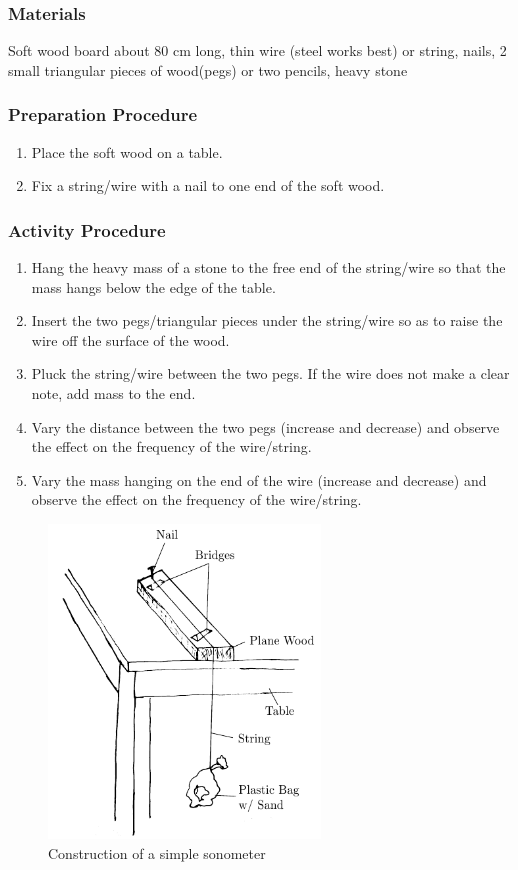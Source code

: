 \subsubsection*{Materials}
Soft wood board about 80 cm long, thin wire (steel works best) or string, nails, 2 small triangular pieces of wood(pegs) or two pencils, heavy stone

\subsubsection*{Preparation Procedure}
\begin{enumerate}
\item{Place the soft wood on a table.} 
\item{Fix a string/wire with a nail to one end of the soft wood.} 
\end{enumerate}

\subsubsection*{Activity Procedure}
\begin{enumerate}
\item{Hang the heavy mass of a stone to the free end of the string/wire so that the mass hangs below the edge of the table.} 
\item{Insert the two pegs/triangular pieces under the string/wire so as to raise the wire off the surface of the wood.} 
\item{Pluck the string/wire between the two pegs. If the wire does not make a clear note, add mass to the end.} 
\item{Vary the distance between the two pegs (increase and decrease) and observe the effect on the frequency of the wire/string.} 
\item{Vary the mass hanging on the end of the wire (increase and decrease) and observe the effect on the frequency of the wire/string.} 
\end{enumerate}

\begin{figure}
\begin{center}
\includegraphics{./img/sonometer.png}
\caption{Construction of a simple sonometer}
\label{fig:sonometert}
\end{center}
\end{figure}

